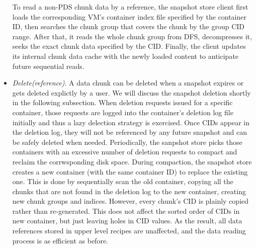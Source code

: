 \begin{itemize}
To read a non-PDS chunk data by a reference,  the snapshot store client first loads the
corresponding VM's container index file specified by the container ID, then searches the chunk
group  that  covers the chunk by the group  CID range.
After that, it reads the whole chunk group from DFS, decompresses it, seeks the exact chunk data 
specified by the CID. 
Finally, the client updates its internal chunk data cache with the newly loaded content to 
anticipate future sequential reads.
\item {\em Delete(reference)}.
A data chunk can be deleted when a snapshot expires or gets deleted explictly by a user.
We will discuss the snapshot deletion shortly in the following subsection.
When deletion requests issued for a specific container,
those requests are logged into the  container's deletion log file initially and thus  a lazy
delection strategy is exercised.
Once CIDs appear in
the deletion log, they will not be referenced by any future snapshot and can be safely deleted when needed. 
Periodically, the sanpshot  store picks those containers with an excessive
number of deletion requests to  compact and  reclaim the corrwsponding disk space. 
During compaction, the snapshot store creates a new container (with the same container ID) to replace the 
existing one. This is done by sequentially scan the old container, copying all the chunks that are not 
found in the deletion log to the new container, creating new chunk groups and indices. 
However, every chunk's CID is plainly copied rather than re-generated. This does not affect the sorted
order of CIDs in new container, but just leaving holes in CID values. As the result, all data references stored 
in upper level recipes are unaffected, and the data reading process is as efficient as before.
\end{itemize}

%

